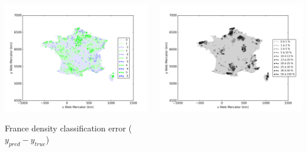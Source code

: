 \documentclass[c]{beamer}
\begin{document}
\begin{frame}
\begin{columns}
 \begin{column}{0.5\textwidth}
  \begin{overlayarea}{\linewidth}{4cm}
    \centering\vfill
    \includegraphics[scale=0.25]{../../data/France/test/Neural_Network_Classification-oversampling/Neural_Network_Classification-oversampling/density_classification_error.png}
  \end{overlayarea}
  \begin{overlayarea}{\linewidth}{0.5cm}
    \centering
    \tiny France density classification error ($y_{pred}-y_{true}$)\par
  \end{overlayarea}
 \end{column}
 \begin{column}{0.5\textwidth}
  \begin{overlayarea}{\linewidth}{4cm}
    \centering\vfill
    \includegraphics[scale=0.25]{../../data/France/test/Neural_Network_Classification-oversampling/Neural_Network_Classification-oversampling/density_covering.png}

\end{overlayarea}
\end{column}
\end{columns}
\end{frame}
\end{document}
